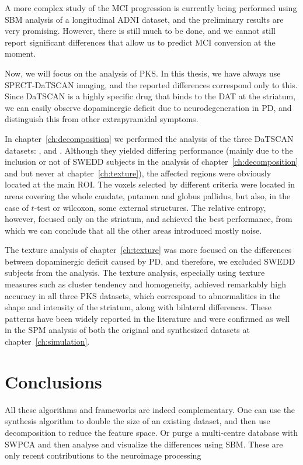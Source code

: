A more complex study of the \ac{MCI} progression is currently being performed using \ac{SBM} analysis of a longitudinal \ac{ADNI} dataset, and the preliminary results are very promising. However, there is still much to be done, and we cannot still report significant differences that allow us to predict \ac{MCI} conversion at the moment. 

Now, we will focus on the analysis of \ac{PKS}. In this thesis, we have always use \ac{SPECT}-DaTSCAN imaging, and the reported differences correspond only to this. Since DaTSCAN is a highly specific drug that binds to the \acs{DAT} at the striatum, we can easily observe dopaminergic deficit due to neurodegeneration in \ac{PD}, and distinguish this from other extrapyramidal symptoms. 

In chapter~\ref{ch:decomposition} we performed the analysis of the three DaTSCAN datasets: \ppmidat{}, \vdlndat{} and \vdlvdat{}. Although they yielded differing performance (mainly due to the inclusion or not of \ac{SWEDD} subjects in the analysis of chapter~\ref{ch:decomposition} and but never at chapter~\ref{ch:texture}), the affected regions were obviously located at the main \ac{ROI}. The voxels selected by different criteria were located in areas covering the whole caudate, putamen and globus pallidus, but also, in the case of $t$-test or wilcoxon, some external structures. The relative entropy, however, focused only on the striatum, and achieved the best performance, from which we can conclude that all the other areas introduced mostly noise.

The texture analysis of chapter~\ref{ch:texture} was more focused on the differences between dopaminergic deficit caused by \ac{PD}, and therefore, we excluded \ac{SWEDD} subjects from the analysis. The texture analysis, especially using texture measures such as cluster tendency and homogeneity, achieved remarkably high accuracy in all three \ac{PKS} datasets, which correspond to abnormalities in the shape and intensity of the striatum, along with bilateral differences. These patterns have been widely reported in the literature \cite{Towey2011,Illan2012,martinez2014parametrization} and were confirmed as well in the \ac{SPM} analysis of both the original and synthesized datasets at chapter~\ref{ch:simulation}. 



\section{Conclusions}


All these algorithms and frameworks are indeed complementary. One can use the synthesis algorithm to double the size of an existing dataset, and then use decomposition to reduce the feature space. Or purge a multi-centre database with \ac{SWPCA} and then analyse and visualize the differences using \ac{SBM}. These are only recent contributions to the neuroimage processing 


